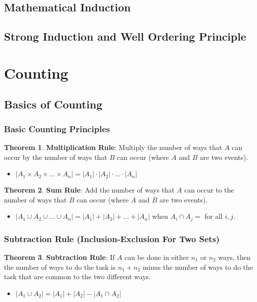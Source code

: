 \documentclass[article, 11pt]{article}
\theoremstyle{definition}
\newtheorem{theorem}{Theorem}[subsubsection]
\newcommand{\unite}{\cup}
\newcommand{\inter}{\cap}
\begin{document}
    \subsection{Mathematical Induction}
    \subsection{Strong Induction and Well Ordering Principle}
    \section{Counting}
    \subsection{Basics of Counting}
    \subsubsection{Basic Counting Principles}
    \begin{theorem}
        \textbf{Multiplication Rule}: Multiply the number of ways that $A$ can occur by the number of ways that $B$ can occur (where $A$ and $B$ are two events).
        \begin{itemize}
            \item $|A_1 \times A_2 \times \dots \times A_n| = |A_1| \cdot |A_2| \cdot \dots \cdot |A_n|$
        \end{itemize}
    \end{theorem}
    \begin{theorem}
        \textbf{Sum Rule}: Add the number of ways that $A$ can occur to the number of ways that $B$ can occur (where $A$ and $B$ are two events).
        \begin{itemize}
            \item $|A_1 \unite A_2 \unite \dots \unite A_n| = |A_1| + |A_2| + \dots + |A_n|$ when $A_i \inter A_j =$ for all $i,j$.
        \end{itemize}
    \end{theorem}
    \subsubsection{Subtraction Rule (Inclusion-Exclusion For Two Sets)}
    \begin{theorem}
        \textbf{Subtraction Rule}: If $A$ can be done in either $n_1$ or $n_2$ ways, then the number of ways to do the task is $n_1 + n_2$ minus the number of ways to do the task that are common to the two different ways.
        \begin{itemize}
            \item $|A_1 \unite A_2| = |A_1| + |A_2| - |A_1 \inter A_2|$
        \end{itemize}
    \end{theorem}
\end{document}
